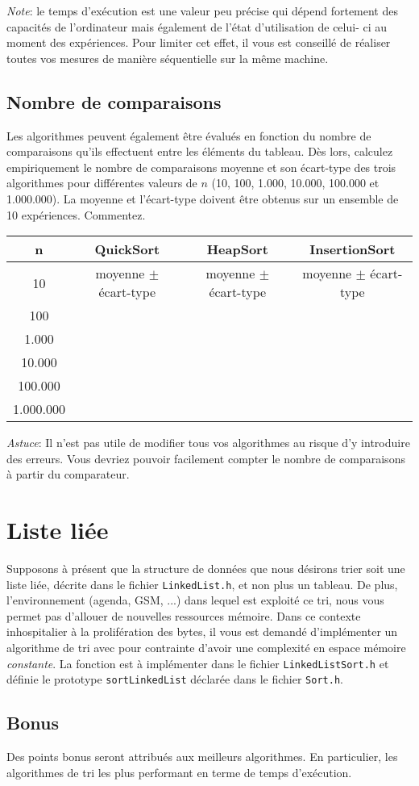\documentclass[a4paper,10pt]{article}
\begin{document}
{\em Note}: le temps d'exécution est une valeur peu précise qui dépend fortement
des capacités de l'ordinateur mais également de l'état d'utilisation de celui-
ci au moment des expériences. Pour limiter cet effet, il vous est conseillé
de réaliser toutes vos mesures de manière séquentielle sur la même machine.

\subsection{Nombre de comparaisons}

Les algorithmes peuvent également être évalués en fonction du nombre de
comparaisons qu'ils effectuent entre les éléments du tableau. Dès lors, calculez
empiriquement le nombre de comparaisons moyenne et son écart-type des trois
algorithmes pour différentes valeurs de $n$ (10, 100, 1.000, 10.000, 100.000 et
1.000.000). La moyenne et l'écart-type doivent être obtenus sur un ensemble de
10 expériences. Commentez.

\begin{center}
\begin{tabular}{cccc}
	\hline
	n & QuickSort & HeapSort & InsertionSort \\
	\hline
	10 & moyenne $\pm$ écart-type & moyenne $\pm$ écart-type & moyenne $\pm$ écart-type\\
	100 & & &\\
	1.000 & & &\\
	10.000 & & &\\
	100.000 & & &\\
	1.000.000 & & &\\
\end{tabular}
\end{center}

{\em Astuce}: Il n'est pas utile de modifier tous vos algorithmes au risque d'y
introduire des erreurs. Vous devriez pouvoir facilement compter le nombre de
comparaisons à partir du comparateur.

\section{Liste liée}
Supposons à présent que la structure de données que nous désirons trier soit une liste liée, décrite dans le fichier \texttt{LinkedList.h}, et non plus un tableau. De plus, l'environnement (agenda, GSM, ...) dans lequel est exploité ce tri, nous vous permet pas d'allouer de nouvelles ressources mémoire. Dans ce contexte inhospitalier à la prolifération des bytes, il vous est demandé d'implémenter un algorithme de tri avec pour contrainte d'avoir une complexité en espace mémoire {\em constante}. La fonction est à implémenter dans le fichier \texttt{LinkedListSort.h} et définie le prototype \texttt{sortLinkedList} déclarée dans le fichier \texttt{Sort.h}.

\subsection*{Bonus}
Des points bonus seront attribués aux meilleurs algorithmes. En particulier, les algorithmes de tri les plus performant en terme de temps d'exécution.
\end{document}
